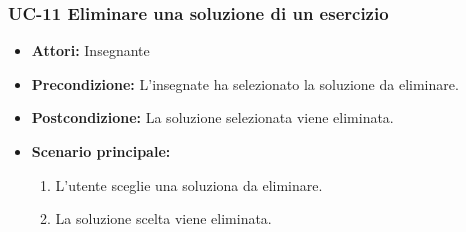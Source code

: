 \subsubsection{UC-11 Eliminare una soluzione di un esercizio}
\begin{itemize}
\item \textbf{Attori: }Insegnante
		\item \textbf{Precondizione: }L'insegnate ha selezionato la soluzione da eliminare.
		\item \textbf{Postcondizione: }La soluzione selezionata viene eliminata. 
		\item \textbf{Scenario principale: }
		\begin{enumerate}
		\item L'utente sceglie una soluziona da eliminare.
		\item La soluzione scelta viene eliminata.
		\end{enumerate}
	\end{itemize}

